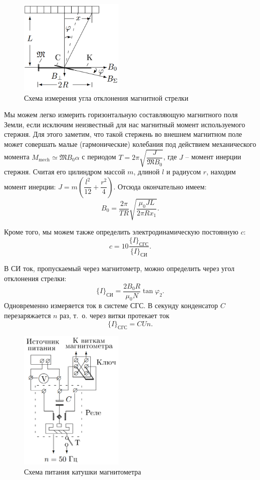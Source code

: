 \documentclass{lab_class}
\newcommand{\magm}{\mathfrak{M}}
\begin{document}
\begin{figure}
\centering
\includegraphics[width=5cm]{Fig2.png}
\caption{Схема измерения угла отклонения магнитной стрелки}
\end{figure}

Мы можем легко измерить горизонтальную составляющую магнитного поля Земли, если исключим неизвестный для нас магнитный момент используемого стержня. Для этого заметим, что такой стержень во внешнем магнитном поле может совершать малые (гармонические) колебания под действием механического момента $M_{\text{mech}} \simeq \magm B_0 \alpha$ с периодом $T = 2\pi \sqrt{ \dfrac{J}{\magm B_0} }$, где $J$ -- момент инерции стержня. Считая его цилиндром массой $m$, длиной $l$ и радиусом $r$, находим момент инерции: $J = m \left( \dfrac{l^2}{12} + \dfrac{r^2}{4} \right)$. Отсюда окончательно имеем:
$$
	B_0 = \dfrac{2\pi}{TR} \sqrt{ \dfrac{\mu_0 J L}{2\pi R x_1} }.
$$

Кроме того, мы можем также определить электродинамическую постоянную $c$:
$$
	c = 10 \dfrac{\{ I \}_{\text{СГС}}}{ \{ I \}_{\text{СИ}}}.
$$

В СИ ток, пропускаемый через магнитометр, можно определить через угол отклонения стрелки:
$$
	\{ I \}_{\text{СИ}} = \dfrac{2 B_0 R}{\mu_0 N} \tan{\varphi_2}.
$$
Одновременно измеряется ток в системе СГС. В секунду конденсатор $C$ перезаряжается $n$ раз, т.~о. через витки протекает ток
$$
	\{ I \}_{\text{СГС}} = C U n.
$$

\begin{figure}
\centering
\includegraphics[width=5cm]{Fig3.png}
\caption{Схема питания катушки магнитометра}
\end{figure}
\end{document}
